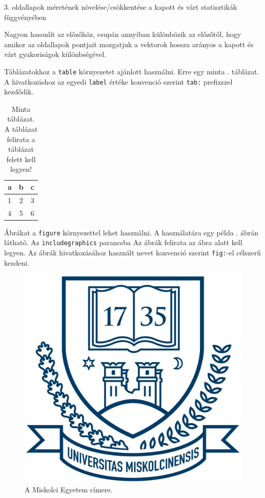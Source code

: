 3. oldallapok méretének növelése/csökkentése a kapott és várt statisztikák függvényében

Nagyon hasonlít az előzőhöz, csupán annyiban különbözik az előzőtől, hogy amikor az oldallapok pontjait mozgatjuk a vektorok hossza arányos a kapott és várt gyakoriságok különbségével.




Táblázatokhoz a \texttt{table} környezetet ajánlott használni.
Erre egy minta . táblázat.
A hivatkozáshoz az egyedi \texttt{label} értéke konvenció szerint \texttt{tab:} prefixszel kezdődik.

\begin{table}[h]
\centering
\caption{Minta táblázat. A táblázat felirata a táblázat felett kell legyen!}
\label{tab:minta}
\begin{tabular}{l|c|c|}
a & b & c \\
\hline
1 & 2 & 3 \\
4 & 5 & 6 \\
\hline
\end{tabular}
\end{table}


Ábrákat a \texttt{figure} környezettel lehet használni.
A használatára egy példa . ábrán látható.
Az \texttt{includegraphics} parancsba 
Az ábrák felirata az ábra alatt kell legyen.
Az ábrák hivatkozásához használt nevet konvenció szerint \texttt{fig:}-el célszerű kezdeni.

\begin{figure}[h]
\centering
\includegraphics[scale=0.3]{images/me_logo.png}
\caption{A Miskolci Egyetem címere.}
\label{fig:cimer}
\end{figure}


